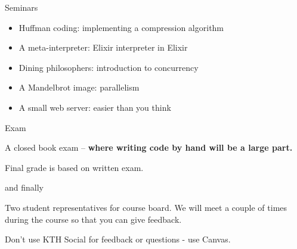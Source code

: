 \begin{frame}{Seminars}
  \begin{itemize}
    \item Huffman coding: implementing a compression algorithm \pause
    \item A meta-interpreter: Elixir interpreter in Elixir \pause
    \item Dining philosophers: introduction to concurrency \pause
    \item A Mandelbrot image: parallelism \pause
    \item A small web server: easier than you think
  \end{itemize}
\end{frame}

\begin{frame}{Exam}

\pause A closed book exam -- {\bf where writing code by hand will be a large part.}

\vspace{20pt}

\pause Final grade is based on written exam. 

\end{frame}

\begin{frame}{and finally}

  Two student representatives for course board. We will meet a couple
  of times during the course so that you can give feedback.

\pause\vspace{20pt}

Don't use KTH Social for feedback or questions - use Canvas. 

\end{frame}


